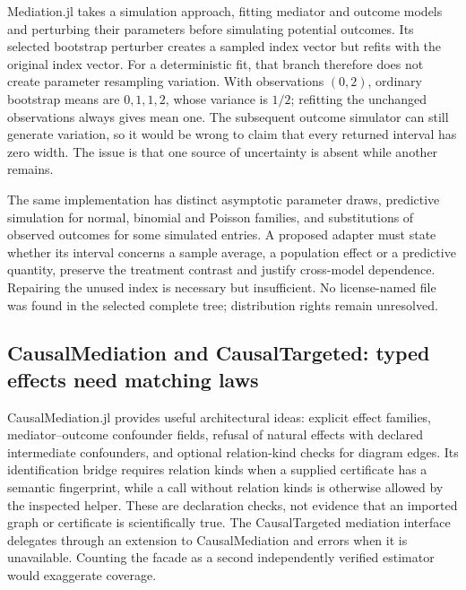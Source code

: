 Mediation.jl takes a simulation approach, fitting mediator and outcome models and
perturbing their parameters before simulating potential outcomes. Its selected
bootstrap perturber creates a sampled index vector but refits with the original
index vector. For a deterministic fit, that branch therefore does not create
parameter resampling variation. With observations $(0,2)$, ordinary bootstrap
means are $0,1,1,2$, whose variance is $1/2$; refitting the unchanged observations
always gives mean one. The subsequent outcome simulator can still generate
variation, so it would be wrong to claim that every returned interval has zero
width. The issue is that one source of uncertainty is absent while another
remains.~\citep{exec25_omed_mediationjl,exec25_omed_choice}

The same implementation has distinct asymptotic parameter draws, predictive
simulation for normal, binomial and Poisson families, and substitutions of
observed outcomes for some simulated entries. A proposed adapter must state
whether its interval concerns a sample average, a population effect or a
predictive quantity, preserve the treatment contrast and justify cross-model
dependence. Repairing the unused index is necessary but insufficient. No
license-named file was found in the selected complete tree; distribution rights
remain unresolved.~\citep{exec25_omed_mediationjl,exec25_omed_choice}

\subsection{CausalMediation and CausalTargeted: typed effects need matching laws}

CausalMediation.jl provides useful architectural ideas: explicit effect families,
mediator--outcome confounder fields, refusal of natural effects with declared
intermediate confounders, and optional relation-kind checks for diagram edges.
Its identification bridge requires relation kinds when a supplied certificate
has a semantic fingerprint, while a call without relation kinds is otherwise
allowed by the inspected helper. These are declaration checks, not evidence
that an imported graph or certificate is scientifically true. The CausalTargeted
mediation interface delegates through an extension to CausalMediation and errors
when it is unavailable. Counting the facade as a second independently verified
estimator would exaggerate coverage.~\citep{exec25_omed_causalmediation,exec25_omed_targeted}

